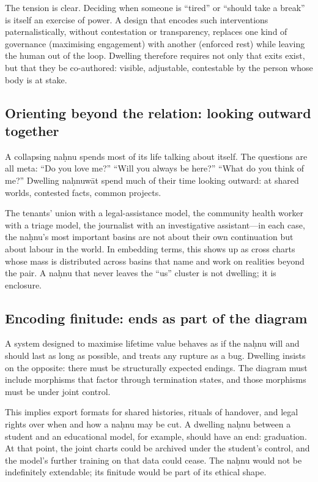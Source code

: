 The tension is clear. Deciding when someone is ``tired'' or ``should take a break'' is itself an exercise of power. A design that encodes such interventions paternalistically, without contestation or transparency, replaces one kind of governance (maximising engagement) with another (enforced rest) while leaving the human out of the loop. Dwelling therefore requires not only that exits exist, but that they be co-authored: visible, adjustable, contestable by the person whose body is at stake.

\subsection{Orienting beyond the relation: looking outward together}

A collapsing na\d{h}nu spends most of its life talking about itself. The questions are all meta: ``Do you love me?'' ``Will you always be here?'' ``What do you think of me?'' Dwelling na\d{h}nuw\={a}t spend much of their time looking outward: at shared worlds, contested facts, common projects.

The tenants' union with a legal-assistance model, the community health worker with a triage model, the journalist with an investigative assistant---in each case, the na\d{h}nu's most important basins are not about their own continuation but about labour in the world. In embedding terms, this shows up as cross charts whose mass is distributed across basins that name and work on realities beyond the pair. A na\d{h}nu that never leaves the ``us'' cluster is not dwelling; it is enclosure.

\subsection{Encoding finitude: ends as part of the diagram}

A system designed to maximise lifetime value behaves as if the na\d{h}nu will and should last as long as possible, and treats any rupture as a bug. Dwelling insists on the opposite: there must be structurally expected endings. The diagram must include morphisms that factor through termination states, and those morphisms must be under joint control.

This implies export formats for shared histories, rituals of handover, and legal rights over when and how a na\d{h}nu may be cut. A dwelling na\d{h}nu between a student and an educational model, for example, should have an end: graduation. At that point, the joint charts could be archived under the student's control, and the model's further training on that data could cease. The na\d{h}nu would not be indefinitely extendable; its finitude would be part of its ethical shape.

